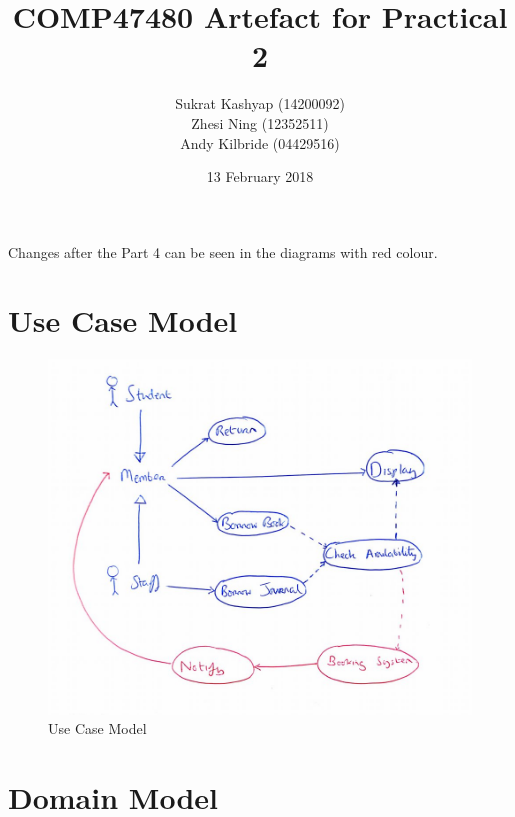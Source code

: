 \documentclass[12pt]{article}
\title{\vspace{-4.0cm}COMP47480 Artefact for Practical 2}
\author{Sukrat Kashyap (14200092)\\Zhesi Ning (12352511)\\Andy Kilbride (04429516)}
\date{13 February 2018}
\begin{document}
\maketitle

Changes after the Part 4 can be seen in the diagrams with red colour.

\section{Use Case Model}

\begin{figure}[!htb]
    \includegraphics[width=\linewidth]{01-use-case.jpg}
    \caption{Use Case Model}
\end{figure}

\section{Domain Model}
\end{document}
